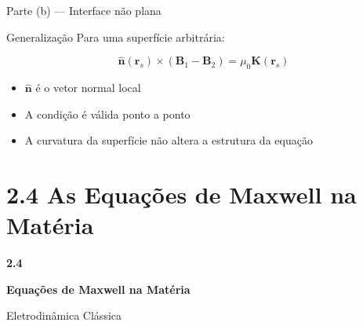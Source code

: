 \documentclass[aspectratio=169]{beamer}
\newcommand{\blue}[1]{\textcolor{myblue}{#1}}
\begin{document}
\begin{frame}{Parte (b) --- Interface não plana}

\begin{block}{Generalização}
Para uma superfície arbitrária:

\begin{equation}
\hat{\mathbf{n}}(\mathbf{r}_s) \times (\mathbf{B}_1 - \mathbf{B}_2)
=
\mu_0 \mathbf{K}(\mathbf{r}_s)
\label{eq:geral}
\end{equation}

\end{block}

\begin{itemize}
\item \(\hat{\mathbf{n}}\) é o vetor normal local
\item A condição é válida ponto a ponto
\item A curvatura da superfície não altera a estrutura da equação
\end{itemize}

\end{frame}



\section{2.4 As Equações de Maxwell na Matéria}


\begin{frame}[plain]
\begin{center}

\vspace{1cm}

{\Huge \textbf{\blue{2.4}}}

\vspace{0.5cm}

{\LARGE \textbf{Equações de Maxwell na Matéria}}

\vspace{1.5cm}

{\large Eletrodinâmica Clássica}


\end{center}
\end{frame}
\end{document}
